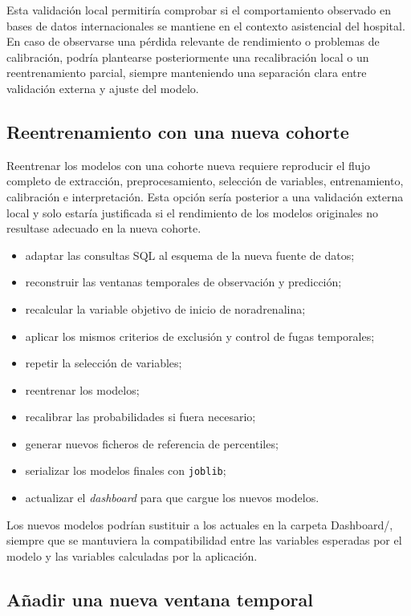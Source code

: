 \documentclass[
  spanish,
  a4paper,
  12pt,
  twoside]{memoir}
\newcommand{\ruta}[1]{{\sffamily #1}}
\begin{document}
Esta validación local permitiría comprobar si el comportamiento observado en bases de datos internacionales se mantiene en el contexto asistencial del hospital. En caso de 
observarse una pérdida relevante de rendimiento o problemas de calibración, podría plantearse posteriormente una recalibración local o un reentrenamiento parcial, siempre 
manteniendo una separación clara entre validación externa y ajuste del modelo.

\subsection*{Reentrenamiento con una nueva cohorte}

Reentrenar los modelos con una cohorte nueva requiere reproducir el flujo completo de extracción, preprocesamiento, selección de variables, entrenamiento, calibración e 
interpretación. Esta opción sería posterior a una validación externa local y solo estaría justificada si el rendimiento de los modelos originales no resultase adecuado en 
la nueva cohorte.

\begin{itemize}
  \item adaptar las consultas SQL al esquema de la nueva fuente de datos;
  \item reconstruir las ventanas temporales de observación y predicción;
  \item recalcular la variable objetivo de inicio de noradrenalina;
  \item aplicar los mismos criterios de exclusión y control de fugas temporales;
  \item repetir la selección de variables;
  \item reentrenar los modelos;
  \item recalibrar las probabilidades si fuera necesario;
  \item generar nuevos ficheros de referencia de percentiles;
  \item serializar los modelos finales con \texttt{joblib};
  \item actualizar el \textit{dashboard} para que cargue los nuevos modelos.
\end{itemize}

Los nuevos modelos podrían sustituir a los actuales en la carpeta \ruta{Dashboard/}, siempre que se mantuviera la compatibilidad entre las variables esperadas por el 
modelo y las variables calculadas por la aplicación.

\subsection*{Añadir una nueva ventana temporal}
\end{document}
